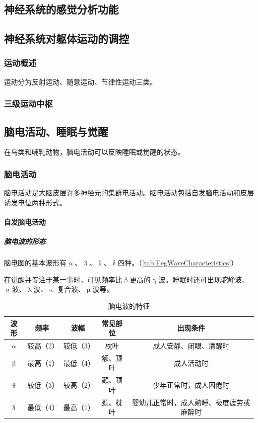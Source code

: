 \subsection{神经系统的感觉分析功能}

\subsection{神经系统对躯体运动的调控}

\subsubsection{运动概述}

运动分为反射运动、随意运动、节律性运动三类。

\subsubsection{三级运动中枢}

\subsection{脑电活动、睡眠与觉醒}

在鸟类和哺乳动物，脑电活动可以反映睡眠或觉醒的状态。

\subsubsection{脑电活动}

脑电活动是大脑皮层许多神经元的集群电活动。脑电活动包括自发脑电活动和皮层诱发电位两种形式。

\paragraph{自发脑电活动}

\subparagraph{脑电波的形态}

脑电图的基本波形有$\upalpha$、$\upbeta$、$\uptheta$、$\updelta$四种。（\autoref{tab:EegWaveCharacteristics}）

在觉醒并专注于某一事时，可见频率比$\upbeta$更高的$\upgamma$波。睡眠时还可出现驼峰波、$\upsigma$波、$\uplambda$波、$\upkappa$-复合波、$\upmu$波等。

\begin{table}[htbp]
	\centering
	\begin{tabularx}{\textwidth}{|c|c|c|c|C|}
		\hline
		\textbf{波形} & \textbf{频率} & \textbf{波幅} & \textbf{常见部位} & \textbf{出现条件} \\ \hline
		$\upalpha$ & 较高（2） & 较低（3） & 枕叶 & 成人安静、闭眼、清醒时 \\ \hline
		$\upbeta$ & 最高（1） & 最低（4） & 额、顶叶 & 成人活动时 \\ \hline
		$\uptheta$ & 较低（3） & 较高（2） & 颞、顶叶 & 少年正常时，成人困倦时 \\ \hline
		$\updelta$ & 最低（4） & 最高（1） & 颞、枕叶 & 婴幼儿正常时，成人熟睡、极度疲劳或麻醉时 \\ \hline
	\end{tabularx}
	\caption{脑电波的特征}
	\label{tab:EegWaveCharacteristics}
\end{table}

